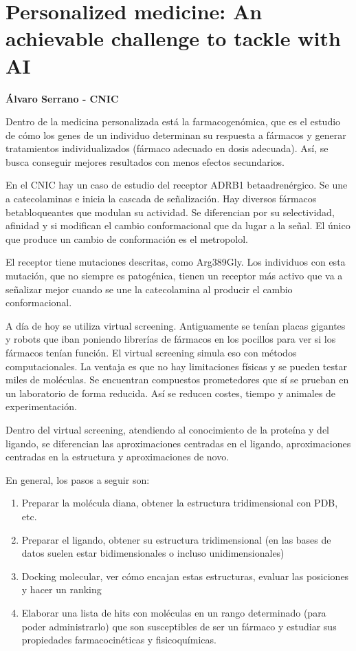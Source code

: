\section{Personalized medicine: An achievable challenge to tackle with AI}
\textbf{Álvaro Serrano - CNIC}

Dentro de la medicina personalizada está la farmacogenómica, que es el estudio de cómo los genes de un individuo determinan su respuesta a fármacos y generar tratamientos individualizados (fármaco adecuado en dosis adecuada). Así, se busca conseguir mejores resultados con menos efectos secundarios. 

En el CNIC hay un caso de estudio del receptor ADRB1 betaadrenérgico. Se une a catecolaminas e inicia la cascada de señalización. Hay diversos fármacos betabloqueantes que modulan su actividad. Se diferencian por su selectividad, afinidad y si modifican el cambio conformacional que da lugar a la señal. El único que produce un cambio de conformación es el metropolol. 

El receptor tiene mutaciones descritas, como Arg389Gly. Los individuos con esta mutación, que no siempre es patogénica, tienen un receptor más activo que va a señalizar mejor cuando se une la catecolamina al producir el cambio conformacional. 

A día de hoy se utiliza virtual screening. Antiguamente se tenían placas gigantes y robots que iban poniendo librerías de fármacos en los pocillos para ver si los fármacos tenían función. El virtual screening simula eso con métodos computacionales. La ventaja es que no hay limitaciones físicas y se pueden testar miles de moléculas. Se encuentran compuestos prometedores que sí se prueban en un laboratorio de forma reducida. Así se reducen costes, tiempo y animales de experimentación. 

Dentro del virtual screening, atendiendo al conocimiento de la proteína y del ligando, se diferencian las aproximaciones centradas en el ligando, aproximaciones centradas en la estructura y aproximaciones de novo. 

En general, los pasos a seguir son:
\begin{enumerate}
\item Preparar la molécula diana, obtener la estructura tridimensional con PDB, etc.
\item Preparar el ligando, obtener su estructura tridimensional (en las bases de datos suelen estar bidimensionales o incluso unidimensionales)
\item Docking molecular, ver cómo encajan estas estructuras, evaluar las posiciones y hacer un ranking
\item Elaborar una lista de hits con moléculas en un rango determinado (para poder administrarlo) que son susceptibles de ser un fármaco y estudiar sus propiedades farmacocinéticas y fisicoquímicas.
\end{enumerate}

